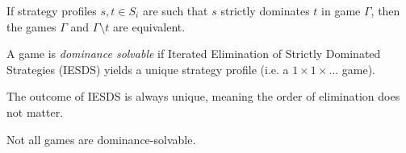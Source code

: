 \begin{fact}
	If strategy profiles $s,t \in S_i$ are such that $s$ strictly dominates $t$
	in game $\Gamma$, then the games $\Gamma$ and $\Gamma \setminus t$ are
	equivalent.
\end{fact}

\begin{definition}
	A game is \textit{dominance solvable} if Iterated Elimination of Strictly
	Dominated Strategies (IESDS) yields a unique strategy profile (i.e. a $1
	\times 1 \times \ldots$ game).
\end{definition}

\begin{fact}
	The outcome of IESDS is always unique, meaning the order of elimination
	does not matter.
\end{fact}

\begin{fact}
	Not all games are dominance-solvable.
\end{fact}
